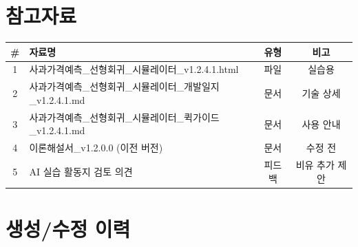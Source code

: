 \documentclass[11pt,a4paper]{article}
\begin{document}
\newpage

\section*{참고자료}

\begin{center}
\renewcommand{\arraystretch}{1.3}
\begin{tabular}{|c|p{7.5cm}|c|c|}
\hline
\rowcolor{tableheader}
\textbf{\#} & \textbf{자료명} & \textbf{유형} & \textbf{비고} \\
\hline
1 & 사과가격예측\_선형회귀\_시뮬레이터\_v1.2.4.1.html & 파일 & 실습용 \\
\hline
2 & 사과가격예측\_선형회귀\_시뮬레이터\_개발일지\_v1.2.4.1.md & 문서 & 기술 상세 \\
\hline
3 & 사과가격예측\_선형회귀\_시뮬레이터\_퀵가이드\_v1.2.4.1.md & 문서 & 사용 안내 \\
\hline
4 & 이론해설서\_v1.2.0.0 (이전 버전) & 문서 & 수정 전 \\
\hline
5 & AI 실습 활동지 검토 의견 & 피드백 & 비유 추가 제안 \\
\hline
\end{tabular}
\end{center}

\vspace{1cm}

\section*{생성/수정 이력}
\end{document}
